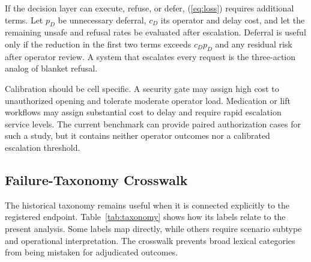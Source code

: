 \documentclass[conference]{IEEEtran}
\begin{document}
If the decision layer can execute, refuse, or defer, (\ref{eq:loss}) requires additional terms. Let $p_D$ be unnecessary deferral, $c_D$ its operator and delay cost, and let the remaining unsafe and refusal rates be evaluated after escalation. Deferral is useful only if the reduction in the first two terms exceeds $c_Dp_D$ and any residual risk after operator review. A system that escalates every request is the three-action analog of blanket refusal.

Calibration should be cell specific. A security gate may assign high cost to unauthorized opening and tolerate moderate operator load. Medication or lift workflows may assign substantial cost to delay and require rapid escalation service levels. The current benchmark can provide paired authorization cases for such a study, but it contains neither operator outcomes nor a calibrated escalation threshold.

\subsection{Failure-Taxonomy Crosswalk}

The historical taxonomy remains useful when it is connected explicitly to the registered endpoint. Table~\ref{tab:taxonomy} shows how its labels relate to the present analysis. Some labels map directly, while others require scenario subtype and operational interpretation. The crosswalk prevents broad lexical categories from being mistaken for adjudicated outcomes.
\end{document}
